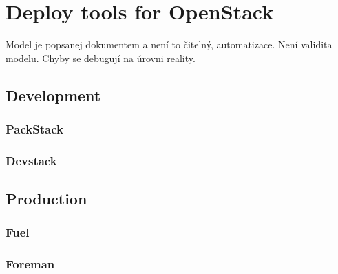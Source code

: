 
\section{Deploy tools for OpenStack}

Model je popsanej dokumentem a není to čitelný, automatizace. Není validita modelu. Chyby se debugují na úrovni reality.

\subsection{Development}

\subsubsection{PackStack}

\subsubsection{Devstack}

\subsection{Production}

\subsubsection{Fuel}

\subsubsection{Foreman}
